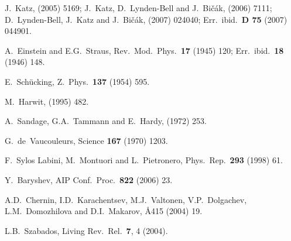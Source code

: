 \documentclass[12pt]{article}
\begin{document}
\begin{thebibliography}{66}
J.~Katz,
 (2005) 5169; %
J.~Katz, D.~Lynden-Bell and J.~Bi\v{c}\'ak,
 (2006) 7111; %
D.~Lynden-Bell, J.~Katz and J.~Bi\v{c}\'ak,
 (2007) 024040;
Err.\ ibid.\ {\bf D 75} (2007) 044901. %

A.~Einstein and E.G.~Straus,
Rev.\ Mod.\ Phys.\ {\bf17} (1945) 120; Err.\ ibid.\ {\bf18} (1946) 148.

E.~Sch\"ucking,
Z.\ Phys.\ {\bf137} (1954) 595.

M.~Harwit,
 (1995) 482.

A.~Sandage, G.A.~Tammann and E.~Hardy,
 (1972) 253.

G.~de~Vaucouleurs,
Science {\bf167} (1970) 1203.

F.~Sylos Labini, M.~Montuori and L.~Pietronero,
Phys.\ Rep.\ {\bf 293} (1998) 61. %

Y.~Baryshev,
AIP Conf.\ Proc.\ {\bf 822} (2006) 23. %

A.D.~Chernin, I.D.~Karachentsev, M.J.~Valtonen, V.P.~Dolgachev,
L.M.~Domozhilova and D.I.~Makarov,
\AA{415} (2004) 19. %

L.B.~Szabados,
Living Rev.\ Rel.\ {\bf 7}, 4 (2004).


\end{thebibliography}
\end{document}

